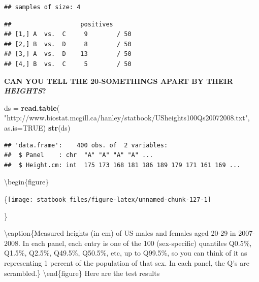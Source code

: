 \documentclass[]{book}
\newenvironment{Shaded}{\begin{snugshade}}{\end{snugshade}}
\newcommand{\DataTypeTok}[1]{\textcolor[rgb]{0.13,0.29,0.53}{#1}}
\newcommand{\DecValTok}[1]{\textcolor[rgb]{0.00,0.00,0.81}{#1}}
\newcommand{\FloatTok}[1]{\textcolor[rgb]{0.00,0.00,0.81}{#1}}
\newcommand{\KeywordTok}[1]{\textcolor[rgb]{0.13,0.29,0.53}{\textbf{#1}}}
\newcommand{\NormalTok}[1]{#1}
\newcommand{\OperatorTok}[1]{\textcolor[rgb]{0.81,0.36,0.00}{\textbf{#1}}}
\newcommand{\OtherTok}[1]{\textcolor[rgb]{0.56,0.35,0.01}{#1}}
\newcommand{\StringTok}[1]{\textcolor[rgb]{0.31,0.60,0.02}{#1}}
\begin{document}
\begin{verbatim}
## samples of size: 4
\end{verbatim}

\begin{verbatim}
##                   positives     
## [1,] A  vs.  C     9        / 50
## [2,] B  vs.  D     8        / 50
## [3,] A  vs.  D    13        / 50
## [4,] B  vs.  C     5        / 50
\end{verbatim}

\textbf{CAN YOU TELL THE 20-SOMETHINGS APART BY THEIR \emph{HEIGHTS}?}

\begin{Shaded}
\begin{Highlighting}[]
\NormalTok{ds =}\StringTok{ }\KeywordTok{read.table}\NormalTok{(}
  \StringTok{"http://www.biostat.mcgill.ca/hanley/statbook/USheights100Qs20072008.txt"}\NormalTok{,}
  \DataTypeTok{as.is=}\OtherTok{TRUE}\NormalTok{)}
\KeywordTok{str}\NormalTok{(ds)}
\end{Highlighting}
\end{Shaded}

\begin{verbatim}
## 'data.frame':    400 obs. of  2 variables:
##  $ Panel    : chr  "A" "A" "A" "A" ...
##  $ Height.cm: int  175 173 168 181 186 189 179 171 161 169 ...
\end{verbatim}

\textbackslash{}begin\{figure\}

\{\centering \texttt{[image: statbook\_files/figure-latex/unnamed-chunk-127-1]}

\}

\textbackslash{}caption\{Measured heights (in cm) of US males and females aged 20-29 in 2007-2008. In each panel, each entry is one of the 100 (sex-specific) quantiles Q0.5\%, Q1.5\%, Q2.5\%, Q49.5\%, Q50.5\%, etc, up to Q99.5\%, so you can think of it as representing 1 percent of the population of that sex. In each panel, the Q's are scrambled.\}\label{fig:unnamed-chunk-127}
\textbackslash{}end\{figure\}
Here are the test results

\begin{Shaded}
\end{Shaded}
\end{document}
